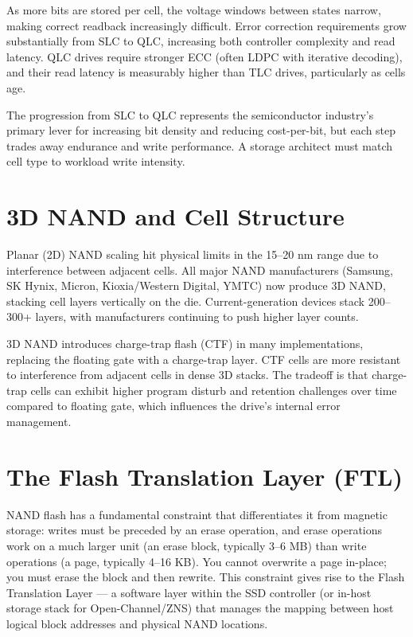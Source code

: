As more bits are stored per cell, the voltage windows between states narrow, making correct readback increasingly difficult. Error correction requirements grow substantially from SLC to QLC, increasing both controller complexity and read latency. QLC drives require stronger ECC (often LDPC with iterative decoding), and their read latency is measurably higher than TLC drives, particularly as cells age.

The progression from SLC to QLC represents the semiconductor industry's primary lever for increasing bit density and reducing cost-per-bit, but each step trades away endurance and write performance. A storage architect must match cell type to workload write intensity.

\section{3D NAND and Cell Structure}
Planar (2D) NAND scaling hit physical limits in the 15--20 nm range due to interference between adjacent cells. All major NAND manufacturers (Samsung, SK Hynix, Micron, Kioxia/Western Digital, YMTC) now produce 3D NAND, stacking cell layers vertically on the die. Current-generation devices stack 200--300+ layers, with manufacturers continuing to push higher layer counts.

3D NAND introduces charge-trap flash (CTF) in many implementations, replacing the floating gate with a charge-trap layer. CTF cells are more resistant to interference from adjacent cells in dense 3D stacks. The tradeoff is that charge-trap cells can exhibit higher program disturb and retention challenges over time compared to floating gate, which influences the drive's internal error management.

\section{The Flash Translation Layer (FTL)}
NAND flash has a fundamental constraint that differentiates it from magnetic storage: writes must be preceded by an erase operation, and erase operations work on a much larger unit (an erase block, typically 3--6 MB) than write operations (a page, typically 4--16 KB). You cannot overwrite a page in-place; you must erase the block and then rewrite. This constraint gives rise to the Flash Translation Layer --- a software layer within the SSD controller (or in-host storage stack for Open-Channel/ZNS) that manages the mapping between host logical block addresses and physical NAND locations.

